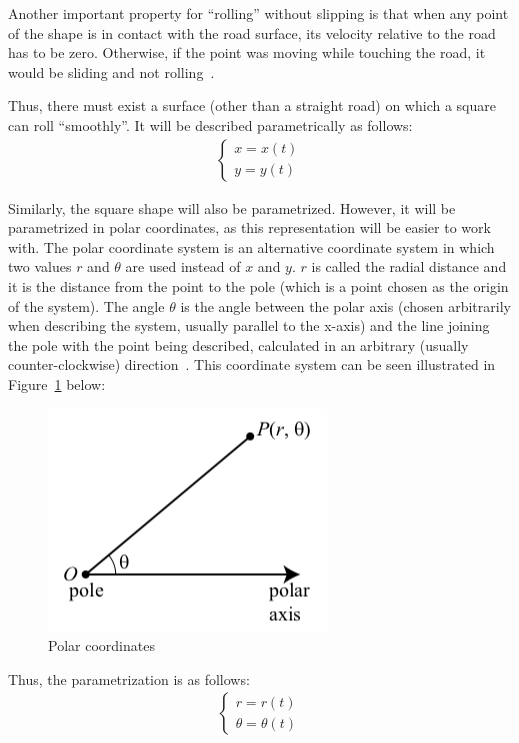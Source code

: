 \documentclass[12pt]{article}
\begin{document}
        Another important property for ``rolling'' without slipping is that when any point of the shape is in contact with the road surface, its velocity relative to the road has to be zero. Otherwise, if the point was moving while touching the road, it would be sliding and not rolling~\cite{morphocular.2022,Tsokos_2014}.
        
        Thus, there must exist a surface (other than a straight road) on which a square can roll ``smoothly''. It will be described parametrically as follows:
        \begin{align}
            \begin{cases}
            x = x(t) \\
            y = y(t)
            \end{cases}
        \end{align}

        Similarly, the square shape will also be parametrized. However, it will be parametrized in polar coordinates, as this representation will be easier to work with. The polar coordinate system is an alternative coordinate system in which two values $r$ and $\theta$ are used instead of $x$ and $y$. $r$ is called the radial distance and it is the distance from the point to the pole (which is a point chosen as the origin of the system). The angle $\theta$ is the angle between the polar axis (chosen arbitrarily when describing the system, usually parallel to the x-axis) and the line joining the pole with the point being described, calculated in an arbitrary (usually counter-clockwise) direction~\cite{Sundstrom2021Polar}. This coordinate system can be seen illustrated in Figure~\ref{fig:polar_definition} below:

        \begin{figure}[]
            \centering\includegraphics[width=0.3\linewidth]{images/polar_definition.png}
            \caption[Polar coordinate system]{Polar coordinates~\cite{Sundstrom2021Polar}}\label{fig:polar_definition}
        \end{figure}
        
        Thus, the parametrization is as follows: 
        \begin{align}
            \begin{cases}
            r = r(t) \\
            \theta = \theta(t)
            \end{cases}
        \end{align}
\end{document}
